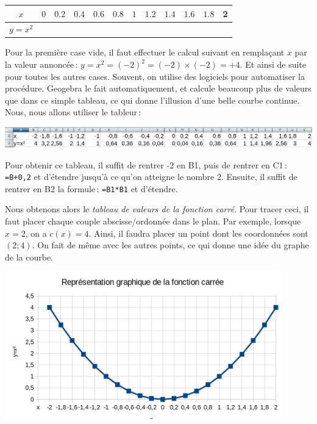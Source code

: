 		\begin{tabular}{|c|c|c|c|c|c|c|c|c|c|c|c|}
			\hline
			$x$     &$  0 $&$ 0.2    $&$ 0.4 $&$ 0.6  $&$ 0.8  $&$ 1   $&$1.2    $&$ 1.4 $&$ 1.6   $&$ 1.8  $& 2\\
			\hline
			$y=x^2$ &       &         &       &        &        &      &         &       &         &        & \\
			\hline
		\end{tabular}

		Pour la première case vide, il faut effectuer le calcul suivant en remplaçant $x$ par la valeur annoncée\,: $y=x^2=(-2)^2=(-2)\times(-2)=+4$. Et ainsi de suite pour toutes les autres cases. Souvent, on utilise des logiciels pour automatiser la procédure. Geogebra le fait automatiquement, et calcule beaucoup plus de valeurs que dans ce simple tableau, ce qui donne l'illusion d'une belle courbe continue. Nous, nous allons utiliser le tableur\,:

		\noindent\includegraphics[width=\textwidth]{image/calcul/valfctcar.png}

		Pour obtenir ce tableau, il suffit de rentrer -2 en B1, puis de rentrer en C1\,: \texttt{=B+0,2} et d'étendre jusqu'à ce qu'on atteigne le nombre 2. Ensuite, il suffit de rentrer en B2 la formule\,: \texttt{=B1*B1} et d'étendre.

		Nous obtenons alors le \emph{tableau de valeurs de la fonction carré}. Pour tracer ceci, il faut placer chaque couple abscisse/ordonnée dans le plan. Par exemple, lorsque $x=2$, on a $c(x)=4$. Ainsi, il faudra placer un point dont les coordonnées sont $(2;4)$. On fait de même avec les autres points, ce qui donne une idée du graphe de la courbe.

		\includegraphics[width=0.9\textwidth]{image/calcul/courbe_fct_car.png}

